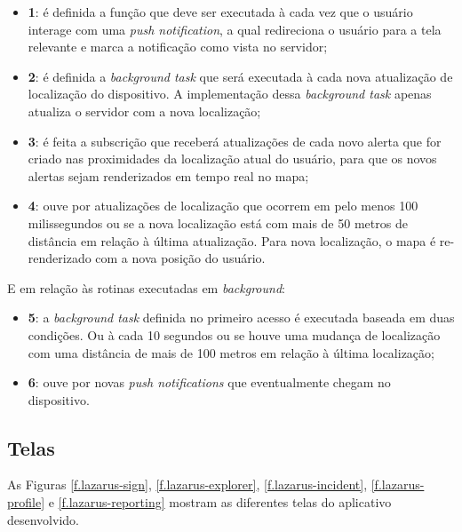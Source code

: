 \begin{itemize}
	\item \textbf{1}: é definida a função que deve ser executada à cada vez que o usuário interage com uma \emph{push notification}, a qual redireciona o usuário para a tela relevante e marca a notificação como vista no servidor;
	\item \textbf{2}: é definida a \emph{background task} que será executada à cada nova atualização de localização do dispositivo. A implementação dessa \emph{background task} apenas atualiza o servidor com a nova localização;
	\item \textbf{3}: é feita a subscrição que receberá atualizações de cada novo alerta que for criado nas proximidades da localização atual do usuário, para que os novos alertas sejam renderizados em tempo real no mapa;
	\item \textbf{4}: ouve por atualizações de localização que ocorrem em pelo menos 100 milissegundos ou se a nova localização está com mais de 50 metros de distância em relação à última atualização. Para nova localização, o mapa é re-renderizado com a nova posição do usuário.
\end{itemize}

E em relação às rotinas executadas em \emph{background}:

\begin{itemize}
	\item \textbf{5}: a \emph{background task} definida no primeiro acesso é executada baseada em duas condições. Ou à cada 10 segundos ou se houve uma mudança de localização com uma distância de mais de 100 metros em relação à última localização;
	\item \textbf{6}: ouve por novas \emph{push notifications} que eventualmente chegam no dispositivo.
\end{itemize}

\subsection{Telas}

As Figuras \ref{f.lazarus-sign}, \ref{f.lazarus-explorer}, \ref{f.lazarus-incident}, \ref{f.lazarus-profile} e \ref{f.lazarus-reporting} mostram as diferentes telas do aplicativo desenvolvido.

